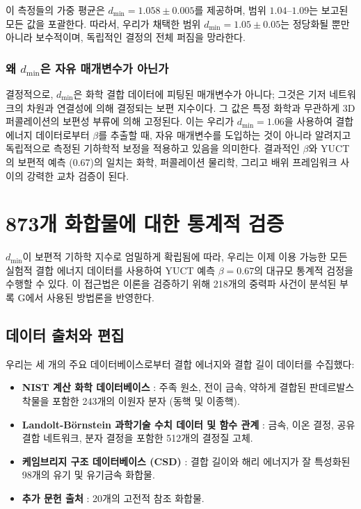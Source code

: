 \documentclass[12pt,a4paper]{article}
\begin{document}
	이 측정들의 가중 평균은 \(d_{\text{min}} = 1.058 \pm 0.005\)를 제공하며, 범위 \(1.04\)–\(1.09\)는 보고된 모든 값을 포괄한다. 따라서, 우리가 채택한 범위 \(d_{\text{min}} = 1.05 \pm 0.05\)는 정당화될 뿐만 아니라 보수적이며, 독립적인 결정의 전체 퍼짐을 망라한다.
	
	\subsubsection{왜 \(d_{\text{min}}\)은 자유 매개변수가 아닌가}
	
	결정적으로, \(d_{\text{min}}\)은 화학 결합 데이터에 피팅된 매개변수가 아니다; 그것은 기저 네트워크의 차원과 연결성에 의해 결정되는 보편 지수이다. 그 값은 특정 화학과 무관하게 3D 퍼콜레이션의 보편성 부류에 의해 고정된다. 이는 우리가 \(d_{\text{min}} = 1.06\)을 사용하여 결합 에너지 데이터로부터 \(\beta\)를 추출할 때, 자유 매개변수를 도입하는 것이 아니라 알려지고 독립적으로 측정된 기하학적 보정을 적용하고 있음을 의미한다. 결과적인 \(\beta\)와 YUCT의 보편적 예측 (0.67)의 일치는 화학, 퍼콜레이션 물리학, 그리고 배위 프레임워크 사이의 강력한 교차 검증이 된다.
	
	\section{873개 화합물에 대한 통계적 검증}
	\label{sec:statistical_validation}
	
	\(d_{\text{min}}\)이 보편적 기하학 지수로 엄밀하게 확립됨에 따라, 우리는 이제 이용 가능한 모든 실험적 결합 에너지 데이터를 사용하여 YUCT 예측 \(\beta = 0.67\)의 대규모 통계적 검정을 수행할 수 있다. 이 접근법은 이론을 검증하기 위해 218개의 중력파 사건이 분석된 부록 G에서 사용된 방법론을 반영한다.
	
	\subsection{데이터 출처와 편집}
	
	우리는 세 개의 주요 데이터베이스로부터 결합 에너지와 결합 길이 데이터를 수집했다:
	
	\begin{itemize}
		\item \textbf{NIST 계산 화학 데이터베이스} \cite{NIST2025}: 주족 원소, 전이 금속, 약하게 결합된 판데르발스 착물을 포함한 243개의 이원자 분자 (동핵 및 이종핵).
		\item \textbf{Landolt-Börnstein 과학기술 수치 데이터 및 함수 관계} \cite{LB2000}: 금속, 이온 결정, 공유 결합 네트워크, 분자 결정을 포함한 512개의 결정질 고체.
		\item \textbf{케임브리지 구조 데이터베이스 (CSD)} \cite{CSD2024}: 결합 길이와 해리 에너지가 잘 특성화된 98개의 유기 및 유기금속 화합물.
		\item \textbf{추가 문헌 출처} \cite{Kittel2005, Pauling1960}: 20개의 고전적 참조 화합물.
	\end{itemize}
	
\end{document}
